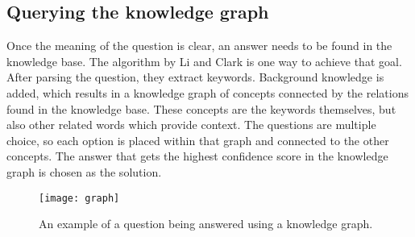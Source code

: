 \subsection{Querying the knowledge graph}
Once the meaning of the question is clear, an answer needs to be found in the knowledge base. The algorithm by Li and Clark \cite{sciencequestions} is one way to achieve that goal. After parsing the question, they extract keywords. Background knowledge is added, which results in a knowledge graph of concepts connected by the relations found in the knowledge base. These concepts are the keywords themselves, but also other related words which provide context. The questions are multiple choice, so each option is placed within that graph and connected to the other concepts. The answer that gets the highest confidence score in the knowledge graph is chosen as the solution.

\begin{figure}[H]
\texttt{[image: graph]}
\caption{An example of a question being answered using a knowledge graph.}\label{fig:parsetree}
\end{figure}





